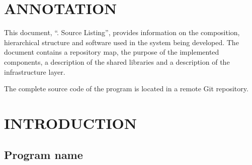 \documentclass[12pt,a4paper]{extarticle}
\begin{document}
\sloppy






\section*{ANNOTATION}

This document, \enquote{\projectname. Source Listing}, provides information on the composition, hierarchical structure and software used in the system being developed. The document contains a repository map, the purpose of the implemented components, a description of the shared libraries and a description of the infrastructure layer.

The complete source code of the program is located in a remote Git repository. 

\clearpage

\hypersetup{linkcolor=black}
\tableofcontents
\hypersetup{linkcolor=blue}
\thispagestyle{fancy}
\clearpage

\section{INTRODUCTION}

\subsection{Program name}
\end{document}
